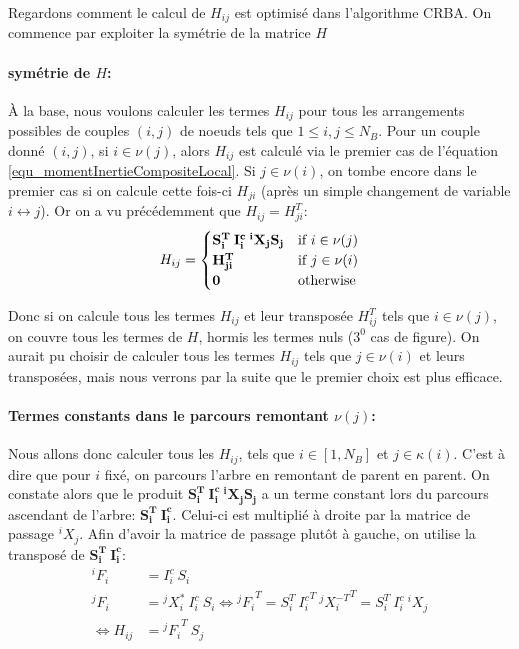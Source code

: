 \documentclass{report}
\begin{document}
Regardons comment le calcul de $H_{ij}$ est optimisé dans l'algorithme CRBA. On commence par exploiter la symétrie de la matrice $H$

\paragraph{symétrie de $H$:}
À la base, nous voulons calculer les termes $H_{ij}$ pour tous les arrangements possibles de couples $(i,j)$ de noeuds tels que $1 \leqslant i,j \leqslant N_B$. Pour un couple donné $(i,j)$, si $i \in \nu(j)$, alors $H_{ij}$ est calculé via le premier cas de l'équation \eqref{equ_momentInertieCompositeLocal}. Si $j \in \nu(i)$, on tombe encore dans le premier cas si on calcule cette fois-ci $H_{ji}$ (après un simple changement de variable $i \leftrightarrow j$). Or on a vu précédemment que $H_{ij}={H_{ji}^T}$:
\begin{equation}
H_{ij} = 
\begin{cases}
\mathbf{{S_i^T} \: {I_i^c} \: {^iX_j} S_j} & \textnormal{if } i \in \nu(j) \\
\mathbf{H_{ji}^T} & \textnormal{if } j \in \nu(i) \\
\mathbf{0} & \textnormal{otherwise}
\end{cases} \label{equ_momentInertieCompositeLocal2}
\end{equation}
\begin{flushleft}
Donc si on calcule tous les termes $H_{ij}$ et leur transposée $H_{ij}^T$ tels que $i \in \nu(j)$, on couvre tous les termes de $H$, hormis les termes nuls ($3^0$ cas de figure). On aurait pu choisir de calculer tous les termes $H_{ij}$ tels que $j \in \nu(i)$ et leurs transposées, mais nous verrons par la suite que le premier choix est plus efficace.
\end{flushleft}

\paragraph{Termes constants dans le parcours remontant $\nu(j)$:}
Nous allons donc calculer tous les $H_{ij}$, tels que $i \in [1,N_B]$ et $j \in \kappa(i)$. C'est à dire que pour $i$ fixé, on parcours l'arbre en remontant de parent en parent. On constate alors que le produit $\mathbf{{S_i^T} \: {I_i^c} \: {^iX_j} S_j}$ a un terme constant lors du parcours ascendant de l'arbre: $\mathbf{{S_i^T} \: {I_i^c}}$. Celui-ci est multiplié à droite par la matrice de passage $^iX_j$. Afin d'avoir la matrice de passage plutôt à gauche, on utilise la transposé de $\mathbf{{S_i^T} \: {I_i^c}}$:
\begin{align}
{^iF_i} &= {I_i^c} \: S_i \\
{^jF_i} &= {^jX_i^*} \: {I_i^c} \: S_i \iff {^jF_i}^T = {S_i^T} \: {I_i^c}^T \: {^jX_i^{-T}}^T = {S_i^T} \: {I_i^c} \: {^iX_j} \\
\iff H_{ij} &= {^jF_i}^T \: S_j
\end{align}
\end{document}
